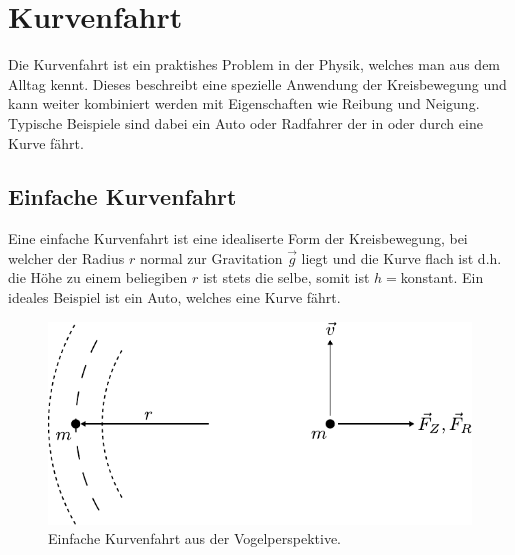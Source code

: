 



\chapter{Kurvenfahrt}

Die Kurvenfahrt ist ein praktishes Problem in der Physik, welches man
aus dem Alltag kennt. Dieses beschreibt eine spezielle Anwendung der
Kreisbewegung und kann weiter kombiniert werden mit Eigenschaften wie
Reibung und Neigung. Typische Beispiele sind dabei ein Auto oder 
Radfahrer der in oder durch eine Kurve fährt.

\newpage
\section{Einfache Kurvenfahrt}
Eine einfache Kurvenfahrt ist eine idealiserte Form der Kreisbewegung,
bei welcher der Radius $r$ normal zur Gravitation $\vec{g}$ liegt und
die Kurve flach ist d.h. die Höhe zu einem beliegiben $r$ ist stets die
selbe, somit ist $h=$konstant. 
Ein ideales Beispiel ist ein Auto, welches eine Kurve fährt.

\begin{figure}[h!]
	\centering
	\includegraphics[scale=0.8]{kurve3.pdf}
	\caption{Einfache Kurvenfahrt aus der Vogelperspektive.}
	\label{fig:kurvenfahrt}
\end{figure}

